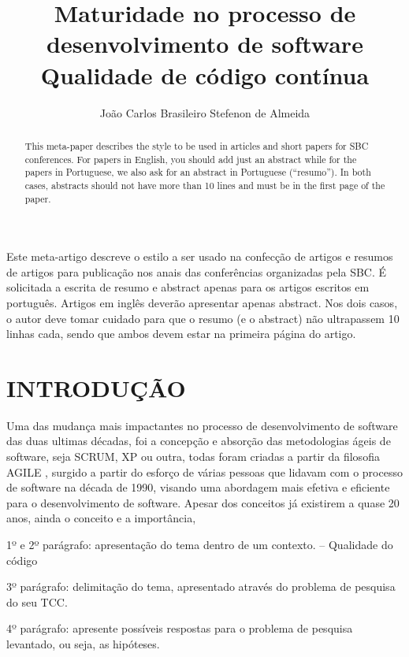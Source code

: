\documentclass[12pt]{article}
\title{Maturidade no processo de desenvolvimento de software\\ Qualidade de código contínua }
\author{João Carlos  Brasileiro Stefenon de Almeida\inst{1}}
\begin{document}
 

\maketitle

\begin{abstract}
  This meta-paper describes the style to be used in articles and short papers
  for SBC conferences. For papers in English, you should add just an abstract
  while for the papers in Portuguese, we also ask for an abstract in
  Portuguese (``resumo''). In both cases, abstracts should not have more than
  10 lines and must be in the first page of the paper.
\end{abstract}
     
\begin{resumo} 
  Este meta-artigo descreve o estilo a ser usado na confecção de artigos e
  resumos de artigos para publicação nos anais das conferências organizadas
  pela SBC. É solicitada a escrita de resumo e abstract apenas para os artigos
  escritos em português. Artigos em inglês deverão apresentar apenas abstract.
  Nos dois casos, o autor deve tomar cuidado para que o resumo (e o abstract)
  não ultrapassem 10 linhas cada, sendo que ambos devem estar na primeira
  página do artigo.
\end{resumo}



\part{INTRODUÇÃO}
Uma das mudança mais impactantes no processo de desenvolvimento de software das duas ultimas décadas, foi a concepção e absorção das metodologias ágeis de software, seja SCRUM, XP ou outra, todas foram criadas a partir da filosofia AGILE \cite{MANISFESTOAGILE}, surgido a partir do esforço de várias pessoas que lidavam com o processo de software na década de 1990, visando uma abordagem mais efetiva e eficiente para o desenvolvimento de software.
Apesar dos conceitos já existirem a quase 20 anos, ainda o conceito e a importância, 
 
1º e 2º parágrafo: apresentação do tema dentro de um contexto.
-- Qualidade do código 

3º parágrafo: delimitação do tema, apresentado através do problema de pesquisa do seu TCC.

4º parágrafo: apresente possíveis respostas para o problema de pesquisa levantado, ou seja, as hipóteses.
\end{document}
